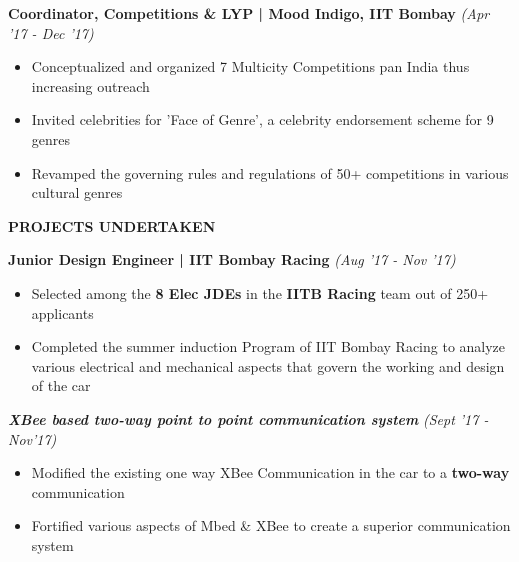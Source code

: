 \documentclass[11pt]{article}%
\begin{document}
\vspace{-0.4cm}
{\flushleft \bf \large{Coordinator, Competitions \& LYP | Mood Indigo, IIT Bombay}} \hfill {{{\em {(Apr '17 - Dec '17)}}}}
\begin{itemize}
\setlength\itemsep{0.01em}
\vspace{-0.2cm}
\item Conceptualized and organized 7 Multicity Competitions pan India thus increasing outreach
\item Invited celebrities for 'Face of Genre’, a celebrity endorsement scheme for 9 genres
\item Revamped the governing rules and regulations of 50+ competitions in various cultural genres
\end{itemize}

\vspace{-0.3cm}









\begin{flushleft}
\vspace{-1mm}
\bf{\LARGE{P}\Large{ROJECTS} \LARGE{U}\Large{NDERTAKEN}}
\end{flushleft}
\vspace{-2mm}
\hline







{\flushleft \bf \large{Junior Design Engineer | IIT Bombay Racing}} \hfill  \hfill {{\em{(Aug '17 - Nov '17)} }}
\begin{itemize}
\vspace{-1mm}
\setlength\itemsep{0.01em}
\item Selected among the \textbf{8 Elec JDEs} in the \textbf{IITB Racing} team out of 250+ applicants
\item Completed the summer induction Program of IIT Bombay Racing to analyze various electrical and mechanical aspects that govern the working and design of the car 
\vspace{-1mm}
\end{itemize}




\vspace{-0.3cm}


{\flushleft \bf \em {\hspace{0.4cm}XBee based two-way point to point communication system}} \hfill {{\em{(Sept '17 - Nov'17)} }}
\begin{itemize}
\vspace{-1mm}
\setlength\itemsep{0.01em}
\item Modified the existing one way XBee Communication in the car to a \textbf{two-way} communication
\item Fortified various aspects of Mbed \& XBee to create a superior communication system
\vspace{-1mm}
\end{itemize}
\end{document}
